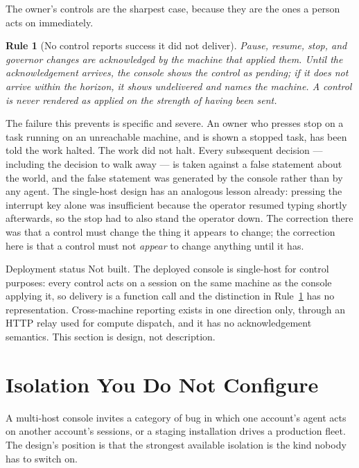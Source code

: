 \documentclass[11pt]{article}
\newtheorem{drule}{Rule}
\begin{document}
The owner's controls are the sharpest case, because they are the ones a person acts on immediately.

\begin{drule}[No control reports success it did not deliver]
\label{rule:control}
Pause, resume, stop, and governor changes are acknowledged by the machine that applied them. Until the acknowledgement arrives, the console shows the control as \emph{pending}; if it does not arrive within the horizon, it shows \emph{undelivered} and names the machine. A control is never rendered as applied on the strength of having been sent.
\end{drule}

The failure this prevents is specific and severe. An owner who presses stop on a task running on an unreachable machine, and is shown a stopped task, has been told the work halted. The work did not halt. Every subsequent decision --- including the decision to walk away --- is taken against a false statement about the world, and the false statement was generated by the console rather than by any agent. The single-host design has an analogous lesson already: pressing the interrupt key alone was insufficient because the operator resumed typing shortly afterwards, so the stop had to also stand the operator down. The correction there was that a control must change the thing it appears to change; the correction here is that a control must not \emph{appear} to change anything until it has.

\begin{notebox}{Deployment status}
Not built. The deployed console is single-host for control purposes: every control acts on a session on the same machine as the console applying it, so delivery is a function call and the distinction in Rule~\ref{rule:control} has no representation. Cross-machine reporting exists in one direction only, through an HTTP relay used for compute dispatch, and it has no acknowledgement semantics. This section is design, not description.
\end{notebox}

\section{Isolation You Do Not Configure}
\label{sec:isolation}

A multi-host console invites a category of bug in which one account's agent acts on another account's sessions, or a staging installation drives a production fleet. The design's position is that the strongest available isolation is the kind nobody has to switch on.
\end{document}
